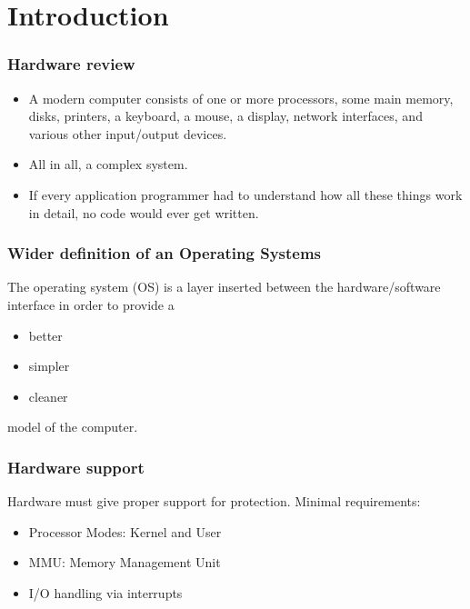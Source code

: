 \section{Introduction}

\begin{frame}
    \frametitle{Hardware review}
    
    \begin{itemize}
        \item 
        A modern  computer  consists  of  one  or  more
        processors, some main  memory, disks,  printers,  
        a  keyboard,  a  mouse, a  display,  
        network  interfaces,  and  various other 
        input/output devices.

        \item 
        All in all, a complex system.
        
        \item 
        If every application programmer had to understand
        how all these things work in detail,
        no code would ever get written.

    \end{itemize}    

\end{frame}

\begin{frame}
    \frametitle{Wider definition of an Operating Systems}
    
    The operating system (OS) is a layer inserted 
    between the hardware/software interface in order
    to provide a 
    \begin{itemize}
        \item better
        \item simpler
        \item cleaner
    \end{itemize} 
    model of the computer.

\end{frame}

\begin{frame}
    \frametitle{Hardware support}
    
    Hardware must give proper support for protection.
    Minimal requirements:
    \begin{itemize}
        \item Processor Modes: Kernel and User
        \item MMU: Memory Management Unit
        \item I/O handling via interrupts
    \end{itemize}

\end{frame}

